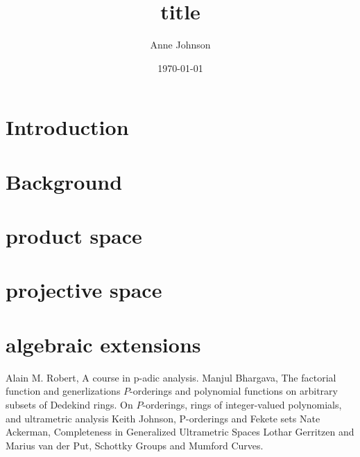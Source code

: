 \documentclass[12pt]{report}
\title{title}
\author{Anne Johnson}
\date{\today}
\theoremstyle{definition}
\begin{document}



\chapter*{Introduction}

\chapter*{Background}

\chapter*{product space}

\chapter*{projective space}

\chapter*{algebraic extensions}



%
%

%	
\begin{thebibliography}{1}
 Alain M. Robert, A course in p-adic analysis.
 Manjul Bhargava, The factorial function and generlizations
 $P$-orderings and polynomial functions on arbitrary subsets of Dedekind rings.
 On $ P$-orderings, rings of integer-valued polynomials, and ultrametric analysis
 Keith Johnson, P-orderings and Fekete sets
 Nate Ackerman,  Completeness in Generalized Ultrametric Spaces
 Lothar Gerritzen and Marius van der Put, Schottky Groups and Mumford Curves.
\end{thebibliography}
\end{document}
